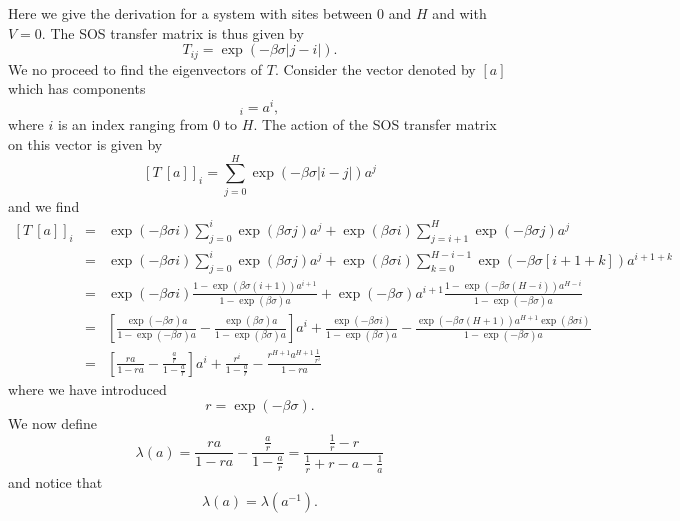 Here we give the derivation for a system with sites between $0$ and $H$ and with $V=0$.  The SOS transfer matrix is thus given by 
\begin{equation}
    T_{ij} = \exp(-\beta\sigma|j-i|).
\end{equation}
We no proceed to find the eigenvectors of $T$.  Consider the vector denoted by $[a]$ which has components
\begin{equation}
[a]_i = a^i,
\end{equation}
where $i$ is an index ranging from $0$ to $H$. 
The action of the SOS transfer matrix on this vector is given by
\begin{equation}
    \left[T\ [a]\right]_i = \sum_{j=0}^H\exp(-\beta\sigma |i-j|)a^j
\end{equation}
and we find
\begin{eqnarray}
\left[T\ [a]\right]_i&=& \exp(-\beta\sigma i)\sum_{j=0}^i\exp(\beta\sigma j)a^j + \exp(\beta\sigma i)
\sum_{j= i+1}^H \exp(-\beta\sigma j)a^j\nonumber \\
&=&\exp(-\beta\sigma i)\sum_{j=0}^i\exp(\beta\sigma j)a^j + \exp(\beta\sigma i) \sum_{k= 0}^{H-i-1} \exp(-\beta\sigma [i+1+k])a^{i+1+k} \nonumber \\
&=& \exp(-\beta\sigma i)\frac{1-\exp(\beta\sigma (i+1))a^{i+1}}{1-\exp(\beta\sigma)a}
+ \exp(-\beta\sigma)a^{i+1}\frac{1- \exp(-\beta\sigma(H-i))a^{H-i}}{1-\exp(-\beta\sigma)a}\nonumber \\
&=& \left[\frac{\exp(-\beta\sigma) a}{1-\exp(-\beta\sigma)a}- \frac{\exp(\beta\sigma) a}{1-\exp(\beta\sigma)a}\right]a^i +\frac{\exp(-\beta\sigma i)}{1-\exp(\beta\sigma)a}-\frac{\exp(-\beta\sigma(H+1))a^{H+1}\exp(\beta\sigma i)}{1-\exp(-\beta\sigma)a}\nonumber\\
&=&\left[\frac{ ra}{1-ra}- \frac{ \frac{a}{r}}{1-\frac{a}{r}}\right]a^i +\frac{r^i}{1-\frac{a}{r}}-\frac{r^{H+1}a^{H+1}\frac{1}{r^i}}{1-ra}\nonumber
\end{eqnarray}
where we have introduced
\begin{equation}
    r=\exp(-\beta\sigma).
\end{equation}
We now define
\begin{equation}
    \lambda(a)= \frac{ ra}{1-ra}- \frac{ \frac{a}{r}}{1-\frac{a}{r}} = \frac{\frac{1}{r}-r}{\frac{1}{r}+r
- a-\frac{1}{a}}\label{elam}
\end{equation}
and notice that
\begin{equation}
    \lambda(a) = \lambda(a^{-1}).
\end{equation}

